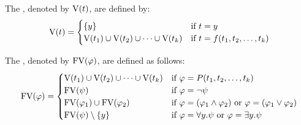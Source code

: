 \begin{definition}
	The , denoted by $\text{V}(t)$, are defined by:
	\[\V(t)=
		\begin{cases}
			\{y\}                                    & \text{if $t=y$}                    \\ %
			\V(t_1)\cup \V(t_2)\cup\dots\cup \V(t_k) & \text{if $t=f(t_1,t_2,\dots,t_k)$} 
		\end{cases}\]
	
	The , denoted by $\text{FV}(\varphi)$, are defined as follows:
	\[\FV(\varphi)=
		\begin{cases} %
			\V(t_1)\cup \V(t_2)\cup\dots\cup \V(t_k) & \text{if $\varphi=P(t_1,t_2,\dots,t_k)$}                               \\
			\FV(\psi)                                 & \text{if $\varphi=\neg\psi$}                               \\
			\FV(\varphi_1)\cup\FV(\varphi_2)         & \text{if $\varphi=(\varphi_1\wedge\varphi_2)$ or $\varphi=(\varphi_1\vee\varphi_2)$} \\
			\FV(\psi)\setminus\{y\}                  & \text{if $\varphi=\forall y.\psi$ or $\varphi=\exists y.\psi$}                 
		\end{cases}\]
\end{definition}

